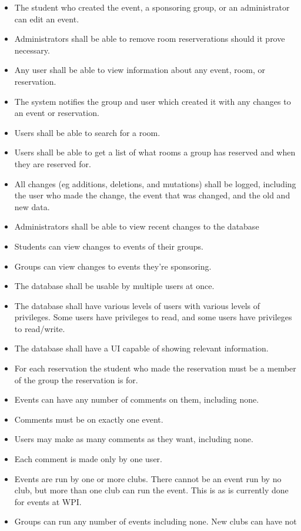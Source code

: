 \documentclass{article}
\begin{document}
\begin{itemize}
\item The student who created the event, a sponsoring group, or an
administrator can edit an event.
\item Administrators shall be able to remove room reserverations
should it prove necessary.
\item Any user shall be able to view information about any event,
room, or reservation.
\item The system notifies the group and user which created it with any
changes to an event or reservation.
\item Users shall be able to search for a room.
\item Users shall be able to get a list of what rooms a group has
reserved and when they are reserved for.
\item All changes (eg additions, deletions, and mutations) shall be
logged, including the user who made the change, the event that was
changed, and the old and new data.
\item Administrators shall be able to view recent changes to the database
\item Students can view changes to events of their groups.
\item Groups can view changes to events they're sponsoring.
\item The database shall be usable by multiple users at once.
\item The database shall have various levels of users with various
levels of privileges. Some users have privileges to read, and some
users have privileges to read/write.
\item The database shall have a UI capable of showing relevant information.
\item For each reservation the student who made the reservation must
be a member of the group the reservation is for.
\item Events can have any number of comments on them, including none.
\item Comments must be on exactly one event.
\item Users may make as many comments as they want, including none.
\item Each comment is made only by one user.
\item Events are run by one or more clubs. There cannot be an event run by no
club, but more than one club can run the event. This is as is currently done for
events at WPI.  
\item Groups can run any number of events including none. New clubs can have not

\end{itemize}
\end{document}
